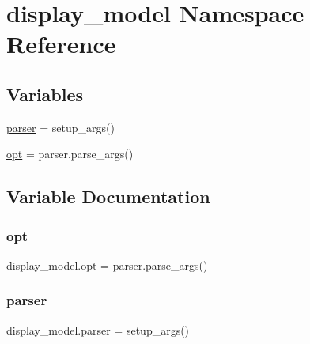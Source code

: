 \hypertarget{namespacedisplay__model}{}\section{display\+\_\+model Namespace Reference}
\label{namespacedisplay__model}
\subsection*{Variables}
\begin{DoxyCompactItemize}
\item 
\hyperlink{namespacedisplay__model_a8d98f27193cc6a84c7f59bb9822d926b}{parser} = setup\+\_\+args()
\item 
\hyperlink{namespacedisplay__model_a6c64a2bc5d01c7047d71dcdeacd12581}{opt} = parser.\+parse\+\_\+args()
\end{DoxyCompactItemize}


\subsection{Variable Documentation}
\mbox{\label{namespacedisplay__model_a6c64a2bc5d01c7047d71dcdeacd12581}} 
\subsubsection{\texorpdfstring{opt}{opt}}
{\footnotesize\ttfamily display\+\_\+model.\+opt = parser.\+parse\+\_\+args()}

\mbox{\label{namespacedisplay__model_a8d98f27193cc6a84c7f59bb9822d926b}} 
\subsubsection{\texorpdfstring{parser}{parser}}
{\footnotesize\ttfamily display\+\_\+model.\+parser = setup\+\_\+args()}

